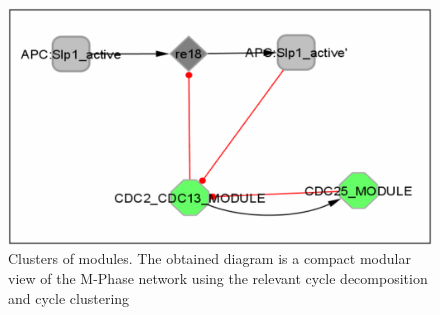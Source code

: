 \begin{figure}
\centering
\includegraphics[width=14 cm]{graphics/Clusters_of_modules_using_the_cycle_decomposition}
\caption{Clusters of modules. The obtained diagram is a compact modular view of the M-Phase network using the relevant cycle decomposition and cycle clustering}
\label{Clusters_of_modules_using_the_cycle_decomposition}
\end{figure}
